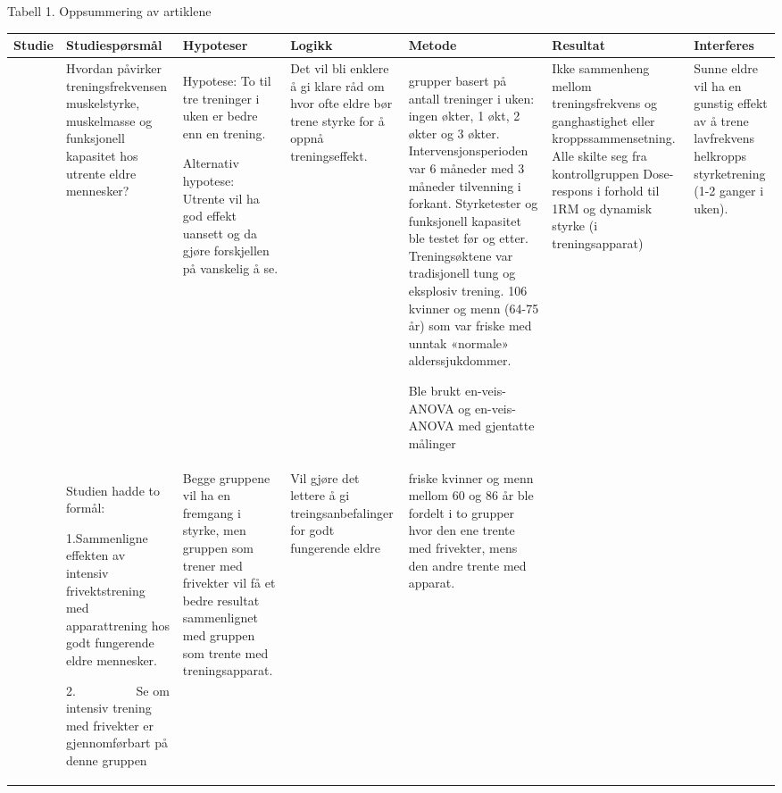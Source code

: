 \documentclass[
]{book}
\begin{document}
Tabell 1. Oppsummering av artiklene

\begin{longtable}[]{@{}
  >{\raggedright\arraybackslash}p{}
  >{\raggedright\arraybackslash}p{}
  >{\raggedright\arraybackslash}p{}
  >{\raggedright\arraybackslash}p{}
  >{\raggedright\arraybackslash}p{}
  >{\raggedright\arraybackslash}p{}
  >{\raggedright\arraybackslash}p{}@{}}
\toprule
Studie & Studiespørsmål & Hypoteser & Logikk & Metode & Resultat & Interferes \\
\midrule
\endhead
\citet{turpela2017} & Hvordan påvirker treningsfrekvensen muskelstyrke, muskelmasse og funksjonell kapasitet hos utrente eldre mennesker? & Hypotese: To til tre treninger i uken er bedre enn en trening.

Alternativ hypotese: Utrente vil ha god effekt uansett og da gjøre forskjellen på vanskelig å se. & Det vil bli enklere å \textbar{} gi klare råd om hvor ofte eldre bør trene styrke for å oppnå treningseffekt. & 4 grupper basert på antall treninger i uken: ingen økter, 1 økt, 2 økter og 3 økter. Intervensjonsperioden var 6 måneder med 3 måneder tilvenning i forkant. Styrketester og funksjonell kapasitet ble testet før og etter. Treningsøktene var tradisjonell tung og eksplosiv trening. 106 kvinner og menn (64-75 år) som var friske med unntak «normale» alderssjukdommer.

Ble brukt en-veis-ANOVA og en-veis-ANOVA med gjentatte målinger & Ikke sammenheng \textbar{} mellom treningsfrekvens og ganghastighet eller kroppssammensetning. Alle skilte seg fra kontrollgruppen Dose-respons i forhold til 1RM og dynamisk styrke (i treningsapparat) & Sunne eldre vil ha en gunstig effekt av å trene lavfrekvens helkropps styrketrening (1-2 ganger i uken). \\
\citet{schott2019} & Studien hadde to \textbar{} formål:

1.Sammenligne effekten av intensiv frivektstrening med apparattrening hos godt fungerende eldre mennesker.

2.~~~~~~~~~ Se om intensiv trening med frivekter er gjennomførbart på denne gruppen & Begge gruppene vil ha \textbar{} en fremgang i styrke, men gruppen som trener med frivekter vil få et bedre resultat sammenlignet med gruppen som trente med treningsapparat. & Vil gjøre det lettere \textbar{} å gi treingsanbefalinger for godt fungerende eldre & 32 friske kvinner \textbar{} og menn mellom 60 og 86 år ble fordelt i to grupper hvor den ene trente med frivekter, mens den andre trente med apparat.


\end{longtable}
\end{document}
